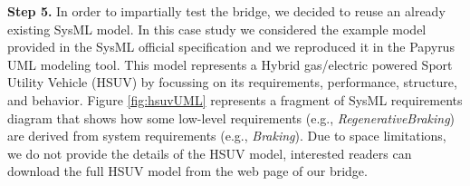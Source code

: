 \textbf{Step 5.} In order to impartially test the bridge, we decided to reuse an already existing SysML model. 
In this case study we considered the example model provided in the SysML official specification and we reproduced it in the Papyrus UML modeling tool.
This model represents a Hybrid gas/electric powered Sport Utility Vehicle (HSUV) by focussing on its requirements, performance, structure, and behavior. Figure \ref{fig:hsuvUML} represents a fragment of SysML requirements diagram that shows how some low-level requirements
(e.g., \textit{RegenerativeBraking})
are derived from system requirements (e.g., \textit{Braking}). Due to space limitations, we do not provide the details of the HSUV model, interested readers can download the full HSUV model from the web page of our bridge. 
%
\vspace{-.4cm}
\begin{figure}
  \centering
 \hspace{2mm}

\end{figure}
